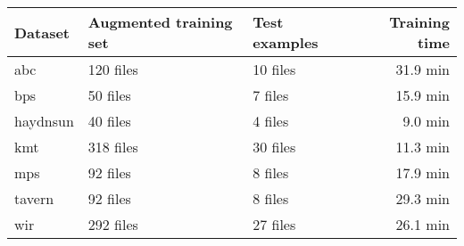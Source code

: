 \begin{tabular}{l|llr}
Dataset        & Augmented training set & Test examples & Training time \\ \hline
\gls{abc}      & 120 files                   & 10 files           & 31.9 min      \\
\gls{bps}      & 50  files                   & 7  files           & 15.9 min      \\
\gls{haydnsun} & 40  files                   & 4  files           & 9.0 min         \\
\gls{kmt}      & 318 files                   & 30 files           & 11.3 min      \\
\gls{mps}      & 92  files                   & 8  files           & 17.9 min      \\
\gls{tavern}   & 92  files                   & 8  files           & 29.3 min      \\
\gls{wir}      & 292 files                   & 27 files           & 26.1 min     
\end{tabular}
